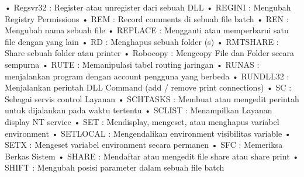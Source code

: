 \documentclass{article}
\begin{document}
• Regsvr32 : Register atau unregister dari sebuah DLL
• REGINI : Mengubah Registry Permissions
• REM : Record comments di sebuah file batch
• REN : Mengubah nama sebuah file
• REPLACE : Mengganti atau memperbarui satu file dengan yang lain
• RD : Menghapus sebuah folder (s)
• RMTSHARE : Share sebuah folder atau printer
• Robocopy : Mengcopy File dan Folder secara sempurna
• RUTE : Memanipulasi tabel routing jaringan
• RUNAS : menjalankan program dengan account pengguna yang berbeda
• RUNDLL32 : Menjalankan perintah DLL Command (add / remove print connections)
• SC : Sebagai servis control Layanan
• SCHTASKS : Membuat atau mengedit perintah untuk dijalankan pada waktu tertentu
• SCLIST : Menampilkan Layanan display NT service
• SET : Mendisplay, mengeset, atau menghapus variabel environment
• SETLOCAL : Mengendalikan environment visibilitas variable
• SETX : Mengeset variabel environment secara permanen
• SFC : Memeriksa Berkas Sistem
• SHARE :  Mendaftar atau mengedit file share atau share print
• SHIFT : Mengubah posisi parameter dalam sebuah file batch
\end{document}
